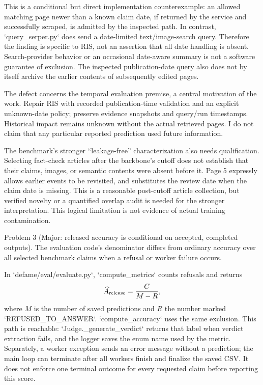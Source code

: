 \documentclass[10pt]{article}
\begin{document}
This is a conditional but direct implementation counterexample: an allowed matching page newer than a known claim date, if returned by the service and successfully scraped, is admitted by the inspected path. In contrast, `query\_serper.py` does send a date-limited text/image-search query. Therefore the finding is specific to RIS, not an assertion that all date handling is absent. Search-provider behavior or an occasional date-aware summary is not a software guarantee of exclusion. The inspected publication-date query also does not by itself archive the earlier contents of subsequently edited pages.\par
The defect concerns the temporal evaluation premise, a central motivation of the work. Repair RIS with recorded publication-time validation and an explicit unknown-date policy; preserve evidence snapshots and query/run timestamps. Historical impact remains unknown without the actual retrieved pages. I do not claim that any particular reported prediction used future information.\par
The benchmark’s stronger “leakage-free” characterization also needs qualification. Selecting fact-check articles after the backbone’s cutoff does not establish that their claims, images, or semantic contents were absent before it. Page 5 expressly allows earlier events to be revisited, and substitutes the review date when the claim date is missing. This is a reasonable post-cutoff article collection, but verified novelty or a quantified overlap audit is needed for the stronger interpretation. This logical limitation is not evidence of actual training contamination.\par
Problem 3 (Major: released accuracy is conditional on accepted, completed outputs).  The evaluation code’s denominator differs from ordinary accuracy over all selected benchmark claims when a refusal or worker failure occurs.\par
In `defame/eval/evaluate.py`, `compute\_metrics` counts refusals and returns \[\widehat A_{\rm release}=\frac{C}{M-R},\] where \(M\) is the number of saved predictions and \(R\) the number marked `REFUSED\_TO\_ANSWER`. `compute\_accuracy` uses the same exclusion. This path is reachable: `Judge.\_generate\_verdict` returns that label when verdict extraction fails, and the logger saves the enum name used by the metric. Separately, a worker exception sends an error message without a prediction; the main loop can terminate after all workers finish and finalize the saved CSV. It does not enforce one terminal outcome for every requested claim before reporting this score.\par
\end{document}
